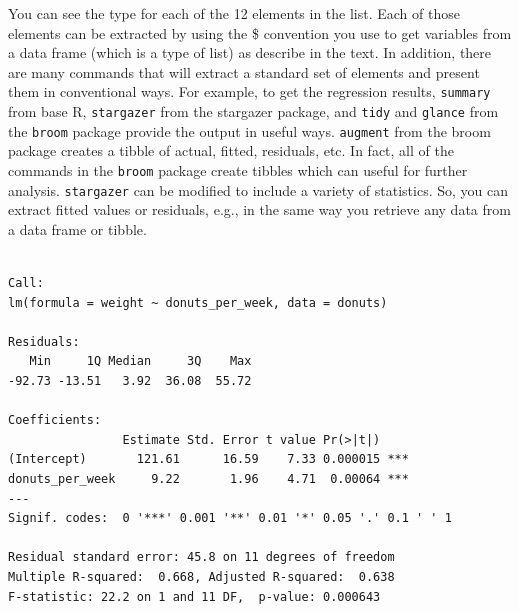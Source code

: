 \documentclass[]{book}
\newenvironment{Shaded}{\begin{snugshade}}{\end{snugshade}}
\newcommand{\DataTypeTok}[1]{\textcolor[rgb]{0.13,0.29,0.53}{#1}}
\newcommand{\KeywordTok}[1]{\textcolor[rgb]{0.13,0.29,0.53}{\textbf{#1}}}
\newcommand{\NormalTok}[1]{#1}
\newcommand{\OperatorTok}[1]{\textcolor[rgb]{0.81,0.36,0.00}{\textbf{#1}}}
\newcommand{\StringTok}[1]{\textcolor[rgb]{0.31,0.60,0.02}{#1}}
\begin{document}
You can see the type for each of the 12 elements in the list. Each of those elements can be extracted by using the \$ convention you use to get variables from a data frame (which is a type of list) as describe in the text. In addition, there are many commands that will extract a standard set of elements and present them in conventional ways. For example, to get the regression results, \texttt{summary} from base R, \texttt{stargazer} from the stargazer package, and \texttt{tidy} and \texttt{glance} from the \texttt{broom} package provide the output in useful ways. \texttt{augment} from the broom package creates a tibble of actual, fitted, residuals, etc. In fact, all of the commands in the \texttt{broom} package create tibbles which can useful for further analysis. \texttt{stargazer} can be modified to include a variety of statistics. So, you can extract fitted values or residuals, e.g., in the same way you retrieve any data from a data frame or tibble.

\begin{Shaded}
\end{Shaded}

\begin{verbatim}

Call:
lm(formula = weight ~ donuts_per_week, data = donuts)

Residuals:
   Min     1Q Median     3Q    Max 
-92.73 -13.51   3.92  36.08  55.72 

Coefficients:
                Estimate Std. Error t value Pr(>|t|)    
(Intercept)       121.61      16.59    7.33 0.000015 ***
donuts_per_week     9.22       1.96    4.71  0.00064 ***
---
Signif. codes:  0 '***' 0.001 '**' 0.01 '*' 0.05 '.' 0.1 ' ' 1

Residual standard error: 45.8 on 11 degrees of freedom
Multiple R-squared:  0.668, Adjusted R-squared:  0.638 
F-statistic: 22.2 on 1 and 11 DF,  p-value: 0.000643
\end{verbatim}

\begin{Shaded}
\end{Shaded}
\end{document}

